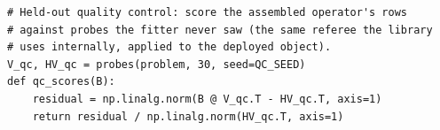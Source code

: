 \begin{verbatim}
# Held-out quality control: score the assembled operator's rows
# against probes the fitter never saw (the same referee the library
# uses internally, applied to the deployed object).
V_qc, HV_qc = probes(problem, 30, seed=QC_SEED)
def qc_scores(B):
    residual = np.linalg.norm(B @ V_qc.T - HV_qc.T, axis=1)
    return residual / np.linalg.norm(HV_qc.T, axis=1)
\end{verbatim}
